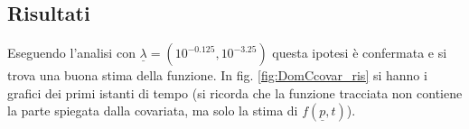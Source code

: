 \documentclass[a4paper,11pt,twoside,openright]{book}							%
\begin{document}
\subsection{Risultati}
Eseguendo l'analisi con $\underline \lambda = (10^{-0.125}, 10^{-3.25})$ questa ipotesi è confermata e si trova una buona stima della funzione. In fig. \ref{fig:DomCcovar_ris} si hanno i grafici dei primi istanti di tempo (si ricorda che la funzione tracciata non contiene la parte spiegata dalla covariata, ma solo la stima di $f(\underline p,t)$). 
\newpage
\begin{figure}[H]
\centering
{}
\end{figure}
\end{document}
